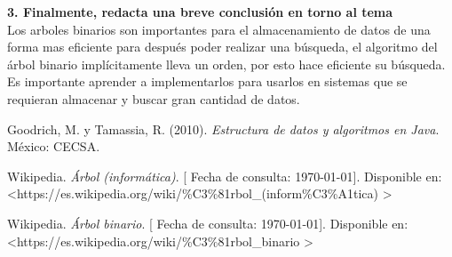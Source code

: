 \documentclass[spanish,12pt,letterpapper]{article}
\begin{document}
	\textbf{3. Finalmente, redacta una breve conclusión en torno al tema\\}
	Los arboles binarios son importantes para el almacenamiento de datos de una forma mas eficiente para después poder realizar una búsqueda, el algoritmo del árbol binario implícitamente lleva un orden, por esto hace eficiente su búsqueda.\\
	
	Es importante aprender a implementarlos para usarlos en sistemas que se requieran almacenar y buscar gran cantidad de datos.
	
	
	\pagebreak
	\begin{thebibliography}{9}
		 Goodrich, M. y Tamassia, R. (2010).
		\emph{Estructura de datos y algoritmos en Java}. México: CECSA.
		
		 Wikipedia. 
		\emph{Árbol (informática)}.  {[} Fecha de consulta: \today {]}. Disponible en: \textless https://es.wikipedia.org/wiki/\%C3\%81rbol\_(inform\%C3\%A1tica) \textgreater
		
		 Wikipedia. 
		\emph{Árbol binario}.  {[} Fecha de consulta: \today {]}. Disponible en: \textless https://es.wikipedia.org/wiki/\%C3\%81rbol\_binario \textgreater

	\end{thebibliography}
	
\end{document}
